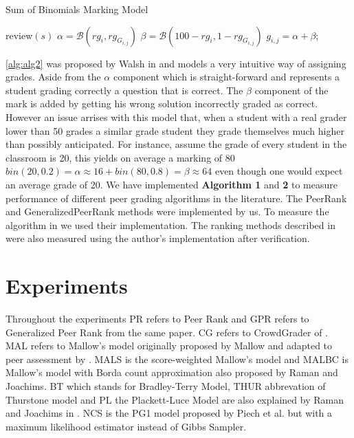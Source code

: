 \documentclass[a4paper]{article}
\begin{document}
\begin{algorithm}
\begin{algorithmic}
  \caption{Sum of Binomials Marking Model}
  \label{alg:alg2}
  
    \State review$(s)$	
     
   		\State$\alpha = \mathcal{B}(rg_i,rg_{G_{i,j}})$ 
        \State$\beta = \mathcal{B}(100-rg_i,1-rg_{G_{i,j}})$
        \State$g_{i,j}= \alpha+\beta$;
    \EndFor
    
  \end{algorithmic}
\end{algorithm}
\ref{alg:alg2} was proposed by Walsh in \cite{Walsh14a} and models a very intuitive way of assigning grades. Aside from the $\alpha$ component which is straight-forward and represents a student grading correctly a question that is correct. The $\beta$ component of the mark is added by getting his wrong solution incorrectly
graded as correct. However an issue arrises with this model that, when a student with a real grader lower than 50 grades a similar grade student they grade themselves much higher than possibly anticipated. For instance, assume the grade of every student in the classroom is 20, this yields on average a marking of 80 $bin(20,0.2) = \alpha \approx 16 + bin(80,0.8) = \beta \approx 64$ even though one would expect an average grade of 20.
We have implemented \textbf{Algorithm 1} and \textbf{2} to measure performance of different peer
grading algorithms in the literature. The PeerRank and GeneralizedPeerRank methods
\cite{Walsh14a} were implemented by us. To measure the algorithm in \cite{Alfaros13} we used
their implementation. The ranking methods described in \cite{RamanJ14} were also measured using
the author's implementation after verification.\\

\clearpage
\section{Experiments}
Throughout the experiments PR refers to Peer Rank \cite{Walsh14a} and GPR refers to Generalized Peer Rank from the same 
paper. CG refers to CrowdGrader of \cite{Alfaros13}. MAL refers to Mallow's model originally proposed by Mallow \cite{citeulike:7065887} and adapted to peer assessment by \cite{RamanJ14}. MALS is the score-weighted Mallow's model and MALBC is Mallow's model with Borda count approximation also proposed by Raman and Joachims\cite{RamanJ14}. BT which stands for Bradley-Terry Model, THUR abbrevation of Thurstone model and PL the Plackett-Luce Model are also explained by Raman and Joachims in \cite{RamanJ14}. NCS is the PG1 model proposed by Piech et al. \cite{PiechHCDNK13} but with a maximum likelihood estimator instead of Gibbs Sampler.
\end{document}
